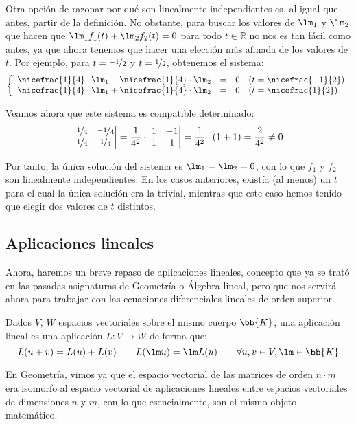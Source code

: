 Otra opción de razonar por qué son linealmente independientes es, al igual que antes, partir de la definición. No obstante, para buscar los valores de $\lm_1$ y $\lm_2$ que hacen que $\lm_1 f_1(t) + \lm_2 f_2(t) = 0$ para todo $t\in \mathbb{R}$ no nos es tan fácil como antes, ya que ahora tenemos que hacer una elección más afinada de los valores de $t$. Por ejemplo, para $t=\nicefrac{-1}{2}$ y $t=\nicefrac{1}{2}$, obtenemos el sistema:
\begin{equation*}
    \left\{\begin{array}{rcll}
        \nicefrac{1}{4}\cdot \lm_1 - \nicefrac{1}{4}\cdot \lm_2 &=& 0 & (t=\nicefrac{-1}{2}) \\
        \nicefrac{1}{4}\cdot \lm_1 + \nicefrac{1}{4}\cdot \lm_2 &=& 0 & (t=\nicefrac{1}{2})
    \end{array}\right.
\end{equation*}

Veamos ahora que este sistema es compatible determinado:
\begin{equation*}
    \begin{vmatrix}
        \nicefrac{1}{4} & \nicefrac{-1}{4} \\
        \nicefrac{1}{4} & \nicefrac{1}{4}
    \end{vmatrix} = \frac{1}{4^2}\cdot \begin{vmatrix}
        1 & -1 \\
        1 & 1
    \end{vmatrix} = \frac{1}{4^2}\cdot (1+1) = \frac{2}{4^2} \neq 0
\end{equation*}

Por tanto, la única solución del sistema es $\lm_1 = \lm_2 = 0$, con lo que $f_1$ y $f_2$ son linealmente independientes. En los casos anteriores, existía (al menos) un $t$ para el cual la única solución era la trivial, mientras que este caso hemos tenido que elegir dos valores de $t$ distintos.

\subsection{Aplicaciones lineales}\label{sec:aplicaciones_lineales}
Ahora, haremos un breve repaso de aplicaciones lineales, concepto que ya se trató en las pasadas asignaturas de Geometría o Álgebra lineal, pero que nos servirá ahora para trabajar con las ecuaciones diferenciales lineales de orden superior.
\begin{definicion}
    Dados $V$, $W$ espacios vectoriales sobre el mismo cuerpo $\bb{K}$, una aplicación lineal es una aplicación $L:V\rightarrow W$ de forma que:
\begin{equation*}
    L(u + v) = L(u) + L(v) \qquad L(\lm u) = \lm L(u) \qquad \forall u,v\in V, \lm \in \bb{K}
\end{equation*}
\end{definicion}
En Geometría, vimos ya que el espacio vectorial de las matrices de orden $n\cdot m$ era isomorfo al espacio vectorial de aplicaciones lineales entre espacios vectoriales de dimensiones $n$ y $m$, con lo que esencialmente, son el mismo objeto matemático.\\


